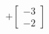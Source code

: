 \documentclass[preview]{standalone}
\begin{document}
\begin{center}
\[+\begin{bmatrix} -3 \\ -2 \end{bmatrix}\]
\end{center}
\end{document}
